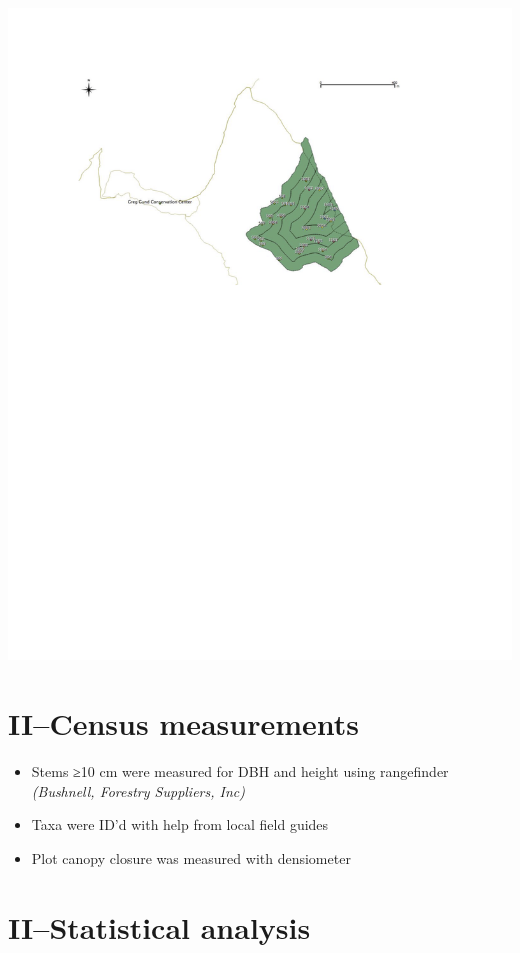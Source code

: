 \documentclass[
]{article}
\begin{document}
\includegraphics{../figs/map.png}

\hypertarget{iicensus-measurements}{%
\section{II--Census measurements}\label{iicensus-measurements}}

\begin{itemize}
\item
  Stems ≥10 cm were measured for DBH and height using rangefinder
  \emph{(Bushnell, Forestry Suppliers, Inc)}
\item
  Taxa were ID'd with help from local field guides
\item
  Plot canopy closure was measured with densiometer
\end{itemize}

\hypertarget{iistatistical-analysis}{%
\section{II--Statistical analysis}\label{iistatistical-analysis}}
\end{document}
